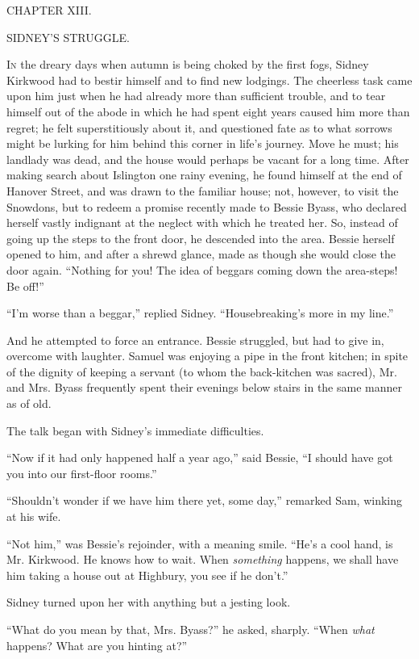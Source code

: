 {}

{CHAPTER XIII.}

SIDNEY'S STRUGGLE.

\textsc{In} the dreary days when autumn is being choked by the first
fogs, Sidney Kirkwood had to bestir himself and to find new lodgings.
The cheerless task came upon him just when he had already more than
sufficient trouble, and to tear himself out of the abode in which he had
spent eight years caused him more than regret; he felt superstitiously
about it, and questioned fate as to what sorrows might be lurking for
him behind this corner in life's journey. Move he must; his landlady was
dead, and the house would perhaps be vacant for a long time. After
making search about Islington one rainy evening, he found himself at the
end of Hanover Street, and was drawn to the familiar house; not,
however, to visit the {}Snowdons, but to redeem a promise recently made
to Bessie Byass, who declared herself vastly indignant at the neglect
with which he treated her. So, instead of going up the steps to the
front door, he descended into the area. Bessie herself opened to him,
and after a shrewd glance, made as though she would close the door
again. ``Nothing for you! The idea of beggars coming down the
area-steps! Be off!''

``I'm worse than a beggar,'' replied Sidney. ``Housebreaking's more in
my line.''

And he attempted to force an entrance. Bessie struggled, but had to give
in, overcome with laughter. Samuel was enjoying a pipe in the front
kitchen; in spite of the dignity of keeping a servant (to whom the
back-kitchen was sacred), Mr. and Mrs. Byass frequently spent their
evenings below stairs in the same manner as of old.

The talk began with Sidney's immediate difficulties.

``Now if it had only happened half a year ago,'' said Bessie, ``I should
have got you into our first-floor rooms.''

{}``Shouldn't wonder if we have him there yet, some day,'' remarked Sam,
winking at his wife.

``Not him,'' was Bessie's rejoinder, with a meaning smile. ``He's a cool
hand, is Mr. Kirkwood. He knows how to wait. When \emph{something}
happens, we shall have him taking a house out at Highbury, you see if he
don't.''

Sidney turned upon her with anything but a jesting look.

``What do you mean by that, Mrs. Byass?'' he asked, sharply. ``When
\emph{what} happens? What are you hinting at?''

